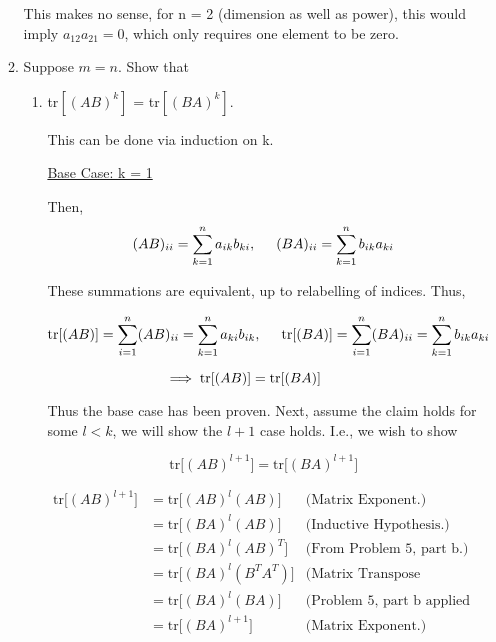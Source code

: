 \documentclass[12pt]{article}
\newcommand{\hop}{\vspace{1mm}}
\newcommand{\jump}{\vspace{5mm}}
\begin{document}
\begin{enumerate}[leftmargin=\labelsep]
\begin{enumerate}
\jump
This makes no sense, for n = 2 (dimension as well as power), this would imply $a_{12}a_{21} = 0$, which only requires one element to be zero.  

\hop
\item Suppose $m = n$. Show that
    \begin{enumerate}
        \item tr$[(AB)^{k}]$ = tr$[(BA)^k]$.

        \hop
        This can be done via induction on k.

        \hop \underline{Base Case: k = 1}

        \hop
        Then,
        \[
        (AB)_{ii} = \sum_{k = 1}^n a_{ik}b_{ki},
        \hspace{5mm}
        (BA)_{ii} = \sum_{k = 1}^n b_{ik}a_{ki}
        \]
        
        \hop
        These summations are equivalent, up to relabelling of indices. Thus,

        \hop
        \[
        \text{tr}[(AB)] = \sum_{i = 1}^n (AB)_{ii} = \sum_{k = 1}^n a_{ki}b_{ik},
        \hspace{5mm}
        \text{tr}[(BA)] = \sum_{i = 1}^n (BA)_{ii} = \sum_{k = 1}^n b_{ik}a_{ki}
        \]

        \hop
        \[
        \hspace{-10mm}\implies \text{tr}[(AB)] = \text{tr}[(BA)]
        \]

        \hop
        Thus the base case has been proven. Next, assume the claim holds for some $l < k$, we will show the $l+1$ case holds. I.e., we wish to show

        \hop
        \[
        \text{tr}\big[ (AB)^{l+1}\big] = \text{tr}\big[ (BA)^{l+1}\big]
        \]

        \begin{align*}
            \text{tr}\big[ (AB)^{l+1}\big] &= \text{tr}\big[ (AB)^{l}(AB)\big]  &\text{(Matrix Exponent.)} \\
            &= \text{tr}\big[ (BA)^{l}(AB)\big] &\text{(Inductive Hypothesis.)} \\
            &= \text{tr}\big[ (BA)^{l}(AB)^T\big] &\text{(From Problem 5, part b.)}\\
            &= \text{tr}\big[ (BA)^{l}(B^TA^T)\big] &\text{(Matrix Transpose Property.)}\\
            &= \text{tr}\big[ (BA)^{l}(BA)\big] &\text{(Problem 5, part b applied  to A and B.)}\\
            &= \text{tr}\big[ (BA)^{l+1}\big] &\text{(Matrix Exponent.)}
        \end{align*}


\end{enumerate}
\end{enumerate}
\end{enumerate}
\end{document}
